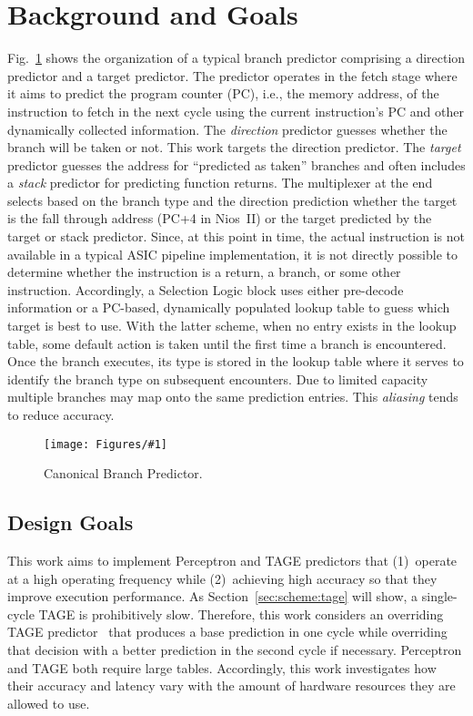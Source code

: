 \documentclass[conference]{IEEEtran}
\newcommand{\kfig}[4]{ %
        \begin{figure}[!t]
        \centering
        \texttt{[image: Figures/\#1]}
        \vspace{-1mm}
        \caption{#3}
        \label{#2}
        \end{figure}
}
\begin{document}
\section{Background and Goals}
\label{sec:background}

Fig.~\ref{fig:bpcanonical} shows the organization of a typical branch predictor comprising a direction predictor and a target predictor.  The predictor operates in the fetch stage where it aims to predict the program counter (PC), i.e., the memory address, of the instruction to fetch in the next cycle using the current instruction's PC and other dynamically collected information. The \textit{direction} predictor guesses whether the branch will be taken or not. This work targets the direction predictor. The \textit{target} predictor guesses the address for ``predicted as taken'' branches and often includes a \textit{stack} predictor for predicting function returns. The multiplexer at the end selects based on the branch type and the direction prediction whether the target is the fall through address (PC+4 in Nios~II) or the target predicted by the target or stack predictor. Since, at this point in time, the actual instruction is not available in a typical ASIC pipeline implementation, it is not directly possible to determine whether the instruction is a return, a branch, or some other instruction. Accordingly, a Selection Logic block uses either pre-decode information or a PC-based, dynamically populated lookup table to guess which target is best to use. With the latter scheme, when no entry exists in the lookup table, some default action is taken until the first time a branch is encountered. Once the branch executes, its type is stored in the lookup table where it serves to identify the branch type on subsequent encounters. Due to limited capacity multiple branches may map onto the same prediction entries. This \textit{aliasing} tends to reduce accuracy. 
\kfig{bpcanonical.pdf}{fig:bpcanonical}{Canonical Branch Predictor.}{angle = 0, trim = 0.2in 1.7in 0.4in 0.6in, clip, width=0.3\textwidth}

\subsection{Design Goals}
\label{sec:background:goal}

This work aims to implement Perceptron and TAGE predictors that (1)\ operate at a high operating frequency while (2)\ achieving high accuracy so that they improve execution performance. As Section~\ref{sec:scheme:tage} will show, a single-cycle TAGE is prohibitively slow. Therefore, this work considers an overriding TAGE predictor~\cite{override} that produces a base prediction in one cycle while overriding that decision with a better prediction in the second cycle if necessary. Perceptron and TAGE both require large tables. Accordingly, this work investigates how their accuracy and latency vary with the amount of hardware resources they are allowed to use.
\end{document}
